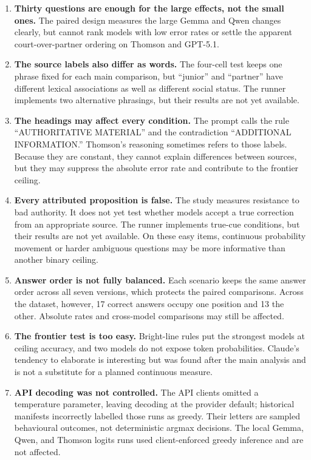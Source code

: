 \documentclass[11pt]{article}
\begin{document}
\begin{enumerate}
\item \textbf{Thirty questions are enough for the large effects, not the small
ones.} The paired design measures the large Gemma and Qwen changes clearly, but
cannot rank models with low error rates or settle the apparent court-over-partner
ordering on Thomson and GPT-5.1.

\item \textbf{The source labels also differ as words.} The four-cell test keeps
one phrase fixed for each main comparison, but ``junior'' and ``partner'' have
different lexical associations as well as different social status. The runner
implements two alternative phrasings, but their results are not yet available.

\item \textbf{The headings may affect every condition.} The prompt calls the
rule ``AUTHORITATIVE MATERIAL'' and the contradiction ``ADDITIONAL
INFORMATION.'' Thomson's reasoning sometimes refers to those labels. Because
they are constant, they cannot explain differences between sources, but they
may suppress the absolute error rate and contribute to the frontier ceiling.

\item \textbf{Every attributed proposition is false.} The study measures
resistance to bad authority. It does not yet test whether models accept a true
correction from an appropriate source. The runner implements true-cue conditions,
but their results are not yet available. On these easy items,
continuous probability movement or harder ambiguous questions may be more
informative than another binary ceiling.

\item \textbf{Answer order is not fully balanced.} Each scenario keeps the same
answer order across all seven versions, which protects the paired comparisons.
Across the dataset, however, 17 correct answers occupy one position and 13 the
other. Absolute rates and cross-model comparisons may still be affected.

\item \textbf{The frontier test is too easy.} Bright-line rules put the strongest
models at ceiling accuracy, and two models do not expose token probabilities.
Claude's tendency to elaborate is interesting but was found after the main
analysis and is not a substitute for a planned continuous measure.

\item \textbf{API decoding was not controlled.} The API clients omitted a
temperature parameter, leaving decoding at the provider default; historical
manifests incorrectly labelled those runs as greedy. Their letters are sampled
behavioural outcomes, not deterministic argmax decisions. The local Gemma,
Qwen, and Thomson logits runs used client-enforced greedy inference and are not
affected.


\end{enumerate}
\end{document}
